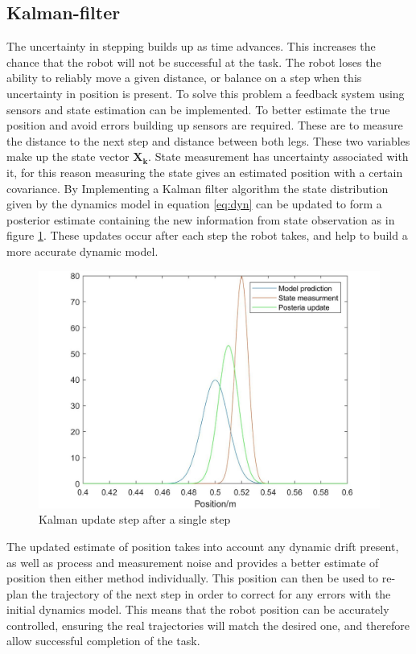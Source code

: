 \documentclass[twoside,twocolumn]{article}
\begin{document}
\subsection{Kalman-filter}
The uncertainty in stepping builds up as time advances. This increases the chance that the robot will not be successful at the task. The robot loses the ability to reliably move a given distance, or balance on a step when this uncertainty in position is present. To solve this problem a feedback system using sensors and state estimation can be implemented.
\newline
To better estimate the true position and avoid errors building up sensors are required. These are to measure the distance to the next step and distance between both legs. These two variables make up the state vector $\boldsymbol{X_k}$. State measurement has uncertainty associated with it, for this reason measuring the state gives an estimated position with a certain covariance.
\newline
By Implementing a Kalman filter algorithm the state distribution given by the dynamics model in equation \ref{eq:dyn} can be updated to form a posterior estimate containing the new information from state observation as in figure \ref{fig:kal}. These updates occur after each step the robot takes, and help to build a more accurate dynamic model.

\begin{figure}[h]
  \centering
    \includegraphics[width=\linewidth]{kalman}
  \caption{Kalman update step after a single step}
  \label{fig:kal}
\end{figure}
The updated estimate of position takes into account any dynamic drift present, as well as process and measurement noise and provides a better estimate of position then either method individually. This position can then be used to re-plan the trajectory of the next step in order to correct for any errors with the initial dynamics model. This means that the robot position can be accurately controlled, ensuring the real trajectories will match the desired one, and therefore allow successful completion of the task.
\end{document}
